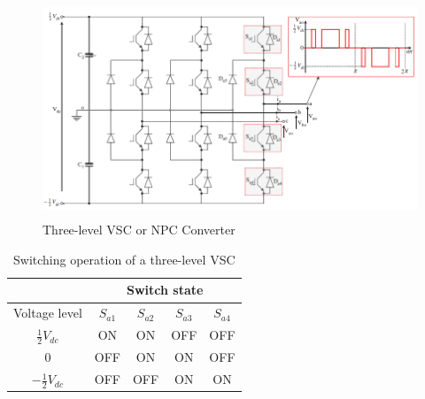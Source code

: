 \begin{figure}[H]
\centering
    \includegraphics[height = 6.5cm,width = 14.5cm]{Diagrams/Chapter_2/3levelVSC.PNG}
    \caption{Three-level VSC or NPC Converter \cite{noauthor_appendix_2014-1}}
    \label{fig:3levelVSC}
\end{figure}

\begin{table}[H]
\centering
\begin{tabular}{c|c|c|c|c|}
\cline{2-5}
                                          & \multicolumn{4}{c|}{Switch state}     \\ \hline
\multicolumn{1}{|c|}{Voltage level}       & $S_{a1}$ & $S_{a2}$ & $S_{a3}$ & $S_{a4}$ \\ \hline
\multicolumn{1}{|c|}{$\frac{1}{2}V_{dc}$}  & ON      & ON      & OFF     & OFF     \\ \hline
\multicolumn{1}{|c|}{0}                   & OFF     & ON      & ON      & OFF     \\ \hline
\multicolumn{1}{|c|}{$-\frac{1}{2}V_{dc}$} & OFF     & OFF     & ON      & ON      \\ \hline
\end{tabular}
\caption{Switching operation of a three-level VSC \cite{noauthor_appendix_2014-1}}
\label{tab:3level_switching}
\end{table}

